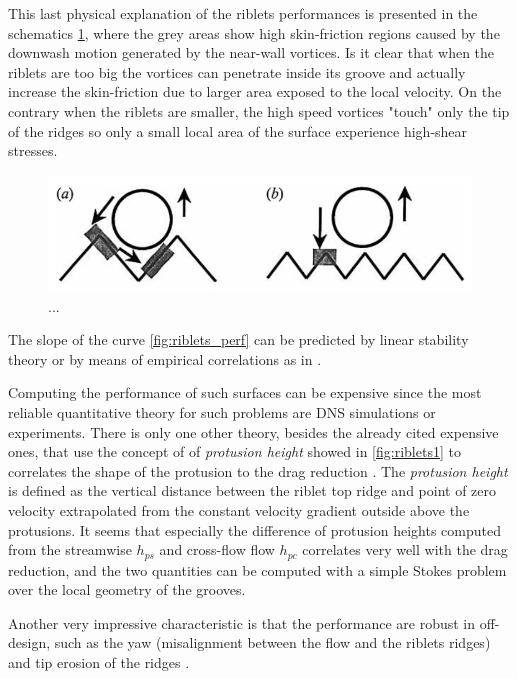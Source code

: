 This last physical explanation of the riblets performances is presented in the schematics \ref{fig:riblets_schem}, where the grey areas show high skin-friction regions caused by the downwash motion generated by the near-wall vortices.
Is it clear that when the riblets are too big the vortices can penetrate inside its groove and actually increase the skin-friction due to larger area exposed to the local velocity.
On the contrary when the riblets are smaller, the high speed vortices "touch" only the tip of the ridges so only a small local area of the surface experience high-shear stresses.

\begin{figure}[h]
	\centering
	\includegraphics[width=0.7\linewidth]{chapter_1/riblets1}
	\caption{ ... \citet{choi1993direct} }
	\label{fig:riblets_schem}
\end{figure}

The slope of the curve \ref{fig:riblets_perf} can be predicted by linear stability theory or by means of empirical correlations as in \citet{garcia2011hydrodynamic}.

Computing the performance of such surfaces can be expensive since the most reliable quantitative theory for such problems are DNS simulations or experiments.
There is only one other theory, besides the already cited expensive ones, that use the concept of of \textit{protusion height} showed in \ref{fig:riblets1} to correlates the shape of the protusion to the drag reduction \citet{luchini1991resistance}.
The \textit{protusion height} is defined as the vertical distance between the riblet top ridge and point of zero velocity extrapolated from the constant velocity gradient outside above the protusions.
It seems that especially the difference of protusion heights computed from the streamwise $h_{ps}$ and cross-flow flow $h_{pc}$ correlates very well with the drag reduction, and the two quantities can be computed with a simple Stokes problem over the local geometry of the grooves.

Another very impressive characteristic is that the performance are robust in off-design, such as the yaw (misalignment between the flow and the riblets ridges) and tip erosion of the ridges \citet{garcia2011drag}.

